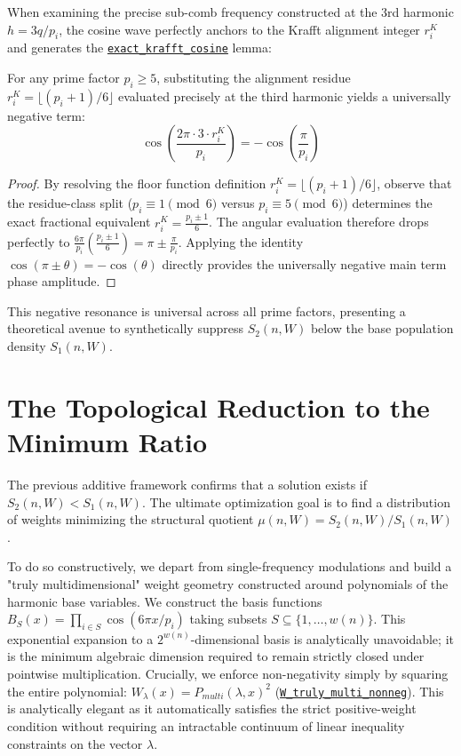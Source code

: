 \documentclass[lean]{AFM}
\renewcommand{\.}{\hskip .75pt}
\def\urlpfx{https://github.com/ElNando888/KrafftSieve/blob/v1.0}
\begin{document}
When examining the precise sub-comb frequency constructed at the 3rd harmonic $h = 3q/p_i$, the
cosine wave perfectly anchors to the Krafft alignment integer $r^K_i$ and generates the
\href{\urlpfx/KrafftSieve/ThirdHarmonic.lean#L728}{\texttt{exact\_krafft\_cosine}} lemma:

\begin{lemma}
For any prime factor $p_i \ge 5$, substituting the alignment residue
$r_i^K = \lfloor(p_i+1)/6\rfloor$ evaluated precisely at the third harmonic yields a
universally negative term:
$$ \cos\left( \frac{2\pi \cdot 3 \cdot r^K_i}{p_i} \right) = -\cos\left( \frac{\pi}{p_i} \right) $$
\end{lemma}
\begin{proof}
By resolving the floor function definition $r_i^K = \lfloor(p_i+1)/6\rfloor$, observe that the
residue-class split ($p_i \equiv 1 \pmod{6}$ versus $p_i \equiv 5 \pmod{6}$) determines the
exact fractional equivalent $r_i^K = \frac{p_i \pm 1}{6}$. The angular evaluation therefore drops
perfectly to $\frac{6\pi}{p_i} \left(\frac{p_i \pm 1}{6}\right) = \pi \pm \frac{\pi}{p_i}$.
Applying the identity $\cos(\pi \pm \theta) = -\cos(\theta)$ directly provides the universally
negative main term phase amplitude.
\end{proof}

This negative resonance is universal across all prime factors, presenting a theoretical avenue
to synthetically suppress $S_2(n, W)$ below the base population density $S_1(n, W)$.

\section{The Topological Reduction to the Minimum Ratio} \label{minimum}

The previous additive framework confirms that a solution exists if $S_2(n, W) < S_1(n, W)$. The
ultimate optimization goal is to find a distribution of weights minimizing the structural quotient
$\mu(n, W) = S_2(n, W) / S_1(n, W)$. 

To do so constructively, we depart from single-frequency modulations and build a "truly
multidimensional" weight geometry constructed around polynomials of the harmonic base variables.
We construct the basis functions $B_S(x) = \prod_{i \in S} \cos(6\pi x/p_i)$ taking subsets
$S \subseteq \{1, \dots, w(n)\}$. This exponential expansion to a $2^{w(n)}$-dimensional basis is
analytically unavoidable; it is the minimum algebraic dimension required to remain strictly closed
under pointwise multiplication. Crucially, we enforce non-negativity simply by squaring the entire
polynomial: $W_{\lambda}(x) = P_{multi}(\lambda, x)^2$
(\href{\urlpfx/KrafftSieve/OptimalWeights.lean#L107}{\texttt{W\_truly\_multi\_nonneg}}). This is
analytically elegant as it automatically satisfies the strict positive-weight condition without
requiring an intractable continuum of linear inequality constraints on the vector $\lambda$.
\end{document}
